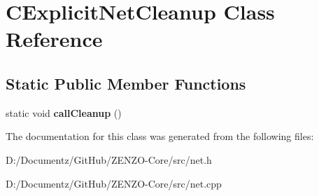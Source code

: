 \hypertarget{class_c_explicit_net_cleanup}{}\section{C\+Explicit\+Net\+Cleanup Class Reference}
\label{class_c_explicit_net_cleanup}
\subsection*{Static Public Member Functions}
\begin{DoxyCompactItemize}
\item 
\mbox{\label{class_c_explicit_net_cleanup_a381b3aec88e5c9432d3777525682c8f5}} 
static void {\bfseries call\+Cleanup} ()
\end{DoxyCompactItemize}


The documentation for this class was generated from the following files\+:\begin{DoxyCompactItemize}
\item 
D\+:/\+Documentz/\+Git\+Hub/\+Z\+E\+N\+Z\+O-\/\+Core/src/net.\+h\item 
D\+:/\+Documentz/\+Git\+Hub/\+Z\+E\+N\+Z\+O-\/\+Core/src/net.\+cpp\end{DoxyCompactItemize}

